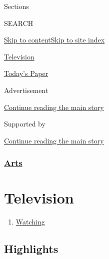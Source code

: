 Sections

SEARCH

\protect\hyperlink{site-content}{Skip to
content}\protect\hyperlink{site-index}{Skip to site index}

\href{https://www.nytimes3xbfgragh.onion/section/arts/television}{Television}

\href{https://myaccount.nytimes3xbfgragh.onion/auth/login?response_type=cookie\&client_id=vi}{}

\href{https://www.nytimes3xbfgragh.onion/section/todayspaper}{Today's
Paper}

Advertisement

\protect\hyperlink{after-top}{Continue reading the main story}

Supported by

\protect\hyperlink{after-sponsor}{Continue reading the main story}

\hypertarget{arts}{%
\subsubsection{\texorpdfstring{\href{/section/arts}{Arts}}{Arts}}\label{arts}}

\hypertarget{television}{%
\section{Television}\label{television}}

\begin{enumerate}
\def\labelenumi{\arabic{enumi}.}
\tightlist
\item
  \href{/watching}{Watching}
\end{enumerate}

\hypertarget{highlights}{%
\subsection{Highlights}\label{highlights}}

